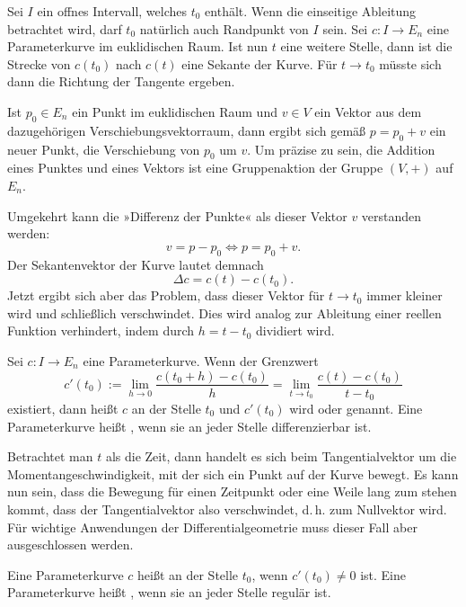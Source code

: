 Sei $I$ ein offnes Intervall, welches $t_0$ enthält. Wenn die einseitige
Ableitung betrachtet wird, darf $t_0$ natürlich auch Randpunkt von $I$
sein. Sei $c\colon I\to E_n$ eine Parameterkurve im euklidischen
Raum. Ist nun $t$ eine weitere Stelle, dann ist die Strecke von
$c(t_0)$ nach $c(t)$ eine Sekante der Kurve. Für $t\to t_0$
müsste sich dann die Richtung der Tangente ergeben.

Ist $p_0\in E_n$ ein Punkt im euklidischen Raum und $v\in V$ ein Vektor
aus dem dazugehörigen Verschiebungsvektorraum, dann ergibt sich
gemäß $p=p_0+v$ ein neuer Punkt, die Verschiebung von $p_0$ um $v$.
Um präzise zu sein, die Addition eines Punktes und eines Vektors ist
eine Gruppenaktion der Gruppe $(V,+)$ auf $E_n$. 

Umgekehrt kann die »Differenz der Punkte« als dieser Vektor $v$
verstanden werden:%
\begin{equation}
v = p-p_0 \iff p = p_0+v.
\end{equation}
Der Sekantenvektor der Kurve lautet demnach
\begin{equation}
\Delta c = c(t)-c(t_0).
\end{equation}
Jetzt ergibt sich aber das Problem, dass dieser Vektor für $t\to t_0$
immer kleiner wird und schließlich verschwindet. Dies wird analog
zur Ableitung einer reellen Funktion verhindert, indem durch $h=t-t_0$
dividiert wird.
\begin{definition}%
\label{diff-Parameterkurve}
Sei $c\colon I\to E_n$ eine Parameterkurve. Wenn der Grenzwert
\begin{equation}
c'(t_0) := \lim_{h\to 0} \frac{c(t_0+h)-c(t_0)}{h}
= \lim_{t\to t_0} \frac{c(t)-c(t_0)}{t-t_0}
\end{equation}
existiert, dann heißt $c$ an der Stelle $t_0$
 und $c'(t_0)$ wird 
oder  genannt. Eine Parameterkurve heißt
, wenn sie an jeder Stelle differenzierbar ist.
\end{definition}
Betrachtet man $t$ als die Zeit, dann handelt es sich beim
Tangentialvektor um die Momentangeschwindigkeit, mit der sich ein
Punkt auf der Kurve bewegt. Es kann nun sein, dass die Bewegung für
einen Zeitpunkt oder eine Weile lang zum stehen kommt, dass der
Tangentialvektor also verschwindet, d.\,h. zum Nullvektor wird.
Für wichtige Anwendungen der Differentialgeometrie muss dieser
Fall aber ausgeschlossen werden.
\begin{definition}
Eine Parameterkurve $c$ heißt  an der Stelle $t_0$,
wenn $c'(t_0)\ne 0$ ist. Eine Parameterkurve heißt ,
wenn sie an jeder Stelle regulär ist.
\end{definition}

